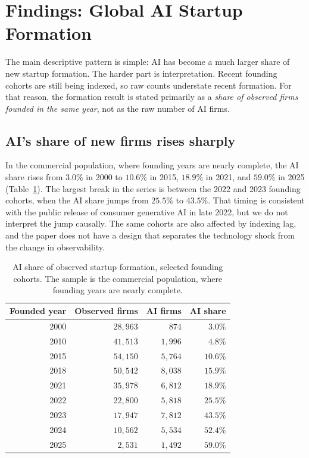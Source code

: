 %  

\section{Findings: Global AI Startup Formation}
\label{sec:findings_global_formation}

The main descriptive pattern is simple: AI has become a much larger share of
new startup formation. The harder part is interpretation. Recent founding
cohorts are still being indexed, so raw counts understate recent formation.
For that reason, the formation result is stated primarily as a \emph{share of
observed firms founded in the same year}, not as the raw number of AI firms.

\subsection{AI's share of new firms rises sharply}

In the commercial population, where founding years are nearly complete, the AI
share rises from $3.0\%$ in 2000 to $10.6\%$ in 2015, $18.9\%$ in 2021, and
$59.0\%$ in 2025 (Table~\ref{tab:formation_selected_years}). The largest break
in the series is between the 2022 and 2023 founding cohorts, when the AI share
jumps from $25.5\%$ to $43.5\%$. That timing is consistent with the public
release of consumer generative AI in late 2022, but we do not interpret the
jump causally. The same cohorts are also affected by indexing lag, and the
paper does not have a design that separates the technology shock from the
change in observability.

\begin{table}[htbp]
\centering\small
\caption{AI share of observed startup formation, selected founding cohorts.
The sample is the commercial population, where founding years are nearly
complete.}
\label{tab:formation_selected_years}
\begin{tabular}{@{}rrrr@{}}
\toprule
\textbf{Founded year} & \textbf{Observed firms} & \textbf{AI firms} &
\textbf{AI share} \\
\midrule
2000 & $28{,}963$ & $874$ & $3.0\%$ \\
2010 & $41{,}513$ & $1{,}996$ & $4.8\%$ \\
2015 & $54{,}150$ & $5{,}764$ & $10.6\%$ \\
2018 & $50{,}542$ & $8{,}038$ & $15.9\%$ \\
2021 & $35{,}978$ & $6{,}812$ & $18.9\%$ \\
2022 & $22{,}800$ & $5{,}818$ & $25.5\%$ \\
2023 & $17{,}947$ & $7{,}812$ & $43.5\%$ \\
2024 & $10{,}562$ & $5{,}534$ & $52.4\%$ \\
2025 & $2{,}531$ & $1{,}492$ & $59.0\%$ \\
\bottomrule
\end{tabular}
\end{table}

